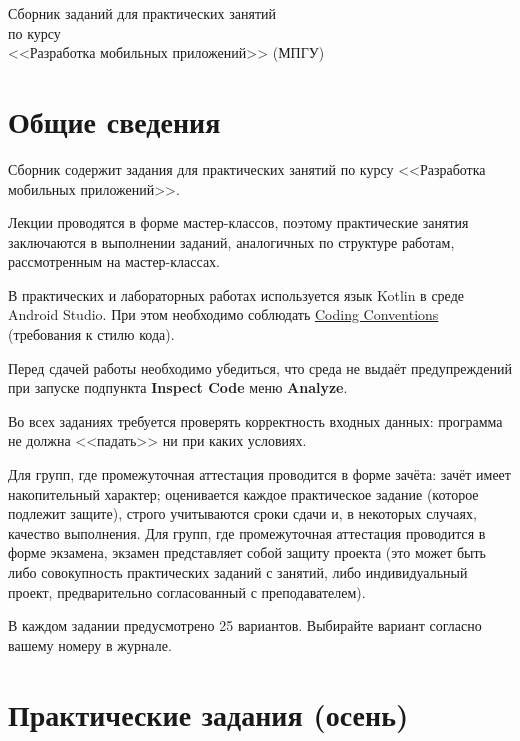 \documentclass{article}
\begin{document}
{
    \thispagestyle{empty}
    \vspace*{\fill}
    \centering

    \Large Сборник заданий для практических занятий \\
    по курсу \\
    <<Разработка мобильных приложений>> (МПГУ) \\
    \large
    \vspace{40pt}
    \vspace*{\fill}
    \newpage
}

\tableofcontents
\newpage
\section{Общие сведения}

Сборник содержит задания для практических занятий по курсу <<Разработка мобильных приложений>>.

Лекции проводятся в форме мастер-классов, поэтому практические занятия заключаются
в выполнении заданий, аналогичных по структуре работам, рассмотренным на мастер-классах.

В практических и лабораторных работах используется язык Kotlin в среде
Android Studio. При этом необходимо соблюдать
\href{https://kotlinlang.org/docs/reference/coding-conventions.html}{Coding Conventions} 
(требования к стилю кода).

Перед сдачей работы необходимо убедиться, что среда не выдаёт предупреждений
при запуске подпункта \textbf{Inspect Code} меню \textbf{Analyze}.

Во всех заданиях требуется проверять корректность входных данных: программа не должна <<падать>>
ни при каких условиях.

Для групп, где промежуточная аттестация проводится в форме зачёта: зачёт имеет накопительный характер; 
оценивается каждое практическое задание (которое подлежит защите), строго учитываются сроки сдачи 
и, в некоторых случаях, качество выполнения. Для групп, где промежуточная аттестация проводится 
в форме экзамена, экзамен представляет собой защиту проекта (это может быть либо совокупность 
практических заданий с занятий, либо индивидуальный проект, предварительно согласованный с преподавателем).

В каждом задании предусмотрено 25 вариантов. Выбирайте вариант согласно вашему номеру в журнале.

\section{Практические задания (осень)}
\end{document}
